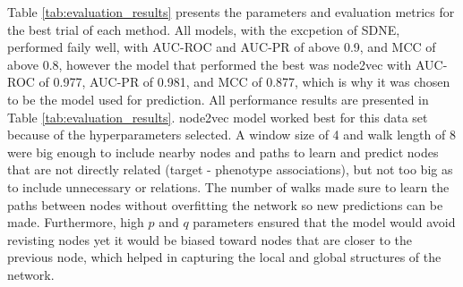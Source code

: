 Table \ref{tab:evaluation_results} presents the parameters and evaluation metrics for the best trial of each method. All models, with the excpetion of \ac{SDNE}, performed faily well, with AUC-ROC and AUC-PR of above 0.9, and MCC of above 0.8, however the model that performed the best was node2vec with AUC-ROC of 0.977, AUC-PR of 0.981, and \ac{MCC} of 0.877, which is why it was chosen to be the model used for prediction. All performance results are presented in Table \ref{tab:evaluation_results}. node2vec model worked best for this data set because of the hyperparameters selected. A window size of 4 and walk length of 8 were big enough to include nearby nodes and paths to learn and predict nodes that are not directly related (target - phenotype associations), but not too big as to include unnecessary or relations. The number of walks made sure to learn the paths between nodes without overfitting the network so new predictions can be made. Furthermore, high $p$ and $q$ parameters ensured that the model would avoid revisting nodes yet it would be biased toward nodes that are closer to the previous node, which helped in capturing the local and global structures of the network.

